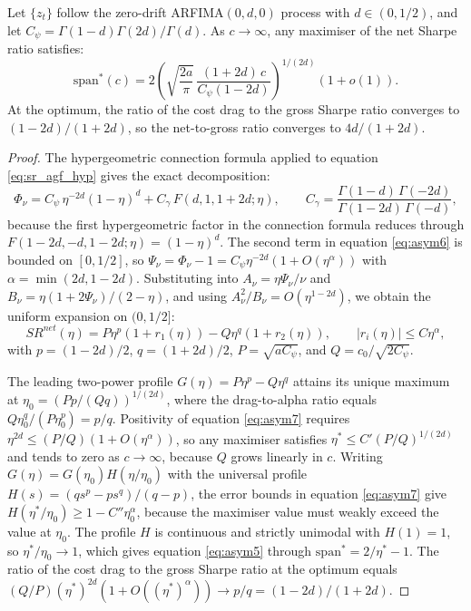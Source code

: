 \documentclass[hidelinks]{siamonline250211}
\newcommand{\spn}{\mathrm{span}}
\begin{document}
\begin{proposition}\label{pr:asym_arfima}
	Let $\{z_{t}\}$ follow the zero-drift ARFIMA$(0,d,0)$ process with $d \in (0, 1/2)$, and let $C_{\psi} = \Gamma(1-d)\Gamma(2d)/\Gamma(d)$. As $c \to \infty$, any maximiser of the net Sharpe ratio satisfies:
	\begin{equation}\label{eq:asym5}
		\spn^{*}(c) = 2 \left( \sqrt{\frac{2a}{\pi}}\, \frac{(1+2d)\, c}{C_{\psi} (1-2d)} \right)^{1/(2d)} \left(1 + o(1)\right).
	\end{equation}
	At the optimum, the ratio of the cost drag to the gross Sharpe ratio converges to $(1-2d)/(1+2d)$, so the net-to-gross ratio converges to $4d/(1+2d)$.
\end{proposition}

\begin{proof}
	The hypergeometric connection formula applied to equation \eqref{eq:sr_agf_hyp} gives the exact decomposition:
	\begin{equation}\label{eq:asym6}
		\Phi_{\nu} = C_{\psi}\, \eta^{-2d} (1-\eta)^{d} + C_{\gamma}\, F(d, 1, 1+2d; \eta), \qquad
		C_{\gamma} = \frac{\Gamma(1-d)\,\Gamma(-2d)}{\Gamma(1-2d)\,\Gamma(-d)},
	\end{equation}
	because the first hypergeometric factor in the connection formula reduces through $F(1-2d, -d, 1-2d; \eta) = (1-\eta)^{d}$. The second term in equation \eqref{eq:asym6} is bounded on $[0, 1/2]$, so $\Psi_{\nu} = \Phi_{\nu} - 1 = C_{\psi}\eta^{-2d}\left(1 + O(\eta^{\alpha})\right)$ with $\alpha = \min(2d, 1-2d)$. Substituting into $A_{\nu} = \eta\Psi_{\nu}/\nu$ and $B_{\nu} = \eta(1+2\Psi_{\nu})/(2-\eta)$, and using $A^{2}_{\nu}/B_{\nu} = O(\eta^{1-2d})$, we obtain the uniform expansion on $(0, 1/2]$:
	\begin{equation}\label{eq:asym7}
		SR^{net}(\eta) = P \eta^{p}\left(1 + r_{1}(\eta)\right) - Q \eta^{q}\left(1 + r_{2}(\eta)\right), \qquad |r_{i}(\eta)| \leq C\eta^{\alpha},
	\end{equation}
	with $p = (1-2d)/2$, $q = (1+2d)/2$, $P = \sqrt{a C_{\psi}}$, and $Q = c_{0}/\sqrt{2 C_{\psi}}$.
	
	The leading two-power profile $G(\eta) = P\eta^{p} - Q\eta^{q}$ attains its unique maximum at $\eta_{0} = \left(Pp/(Qq)\right)^{1/(2d)}$, where the drag-to-alpha ratio equals $Q\eta_{0}^{q}/(P\eta_{0}^{p}) = p/q$. Positivity of equation \eqref{eq:asym7} requires $\eta^{2d} \leq (P/Q)(1+O(\eta^{\alpha}))$, so any maximiser satisfies $\eta^{*} \leq C'(P/Q)^{1/(2d)}$ and tends to zero as $c \to \infty$, because $Q$ grows linearly in $c$. Writing $G(\eta) = G(\eta_{0}) H(\eta/\eta_{0})$ with the universal profile $H(s) = (q s^{p} - p s^{q})/(q-p)$, the error bounds in equation \eqref{eq:asym7} give $H(\eta^{*}/\eta_{0}) \geq 1 - C''\eta_{0}^{\alpha}$, because the maximiser value must weakly exceed the value at $\eta_{0}$. The profile $H$ is continuous and strictly unimodal with $H(1)=1$, so $\eta^{*}/\eta_{0} \to 1$, which gives equation \eqref{eq:asym5} through $\spn^{*} = 2/\eta^{*} - 1$. The ratio of the cost drag to the gross Sharpe ratio at the optimum equals $(Q/P)(\eta^{*})^{2d}(1+O((\eta^{*})^{\alpha})) \to p/q = (1-2d)/(1+2d)$.
\end{proof}
\end{document}
